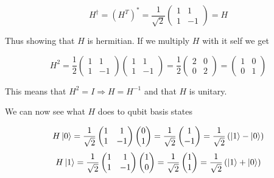\documentclass[a4paper,norsk, 10pt]{article}
\begin{document}
\begin{equation}
H^\dagger = (H^T)^* = 
\frac{1}{\sqrt{2}}
\begin{pmatrix}
1 & 1 \\
1 & -1
\end{pmatrix}
= H
\end{equation}

Thus showing that $H$ is hermitian. If we multiply $H$ with it self we get

\begin{equation}
H^2 = \frac{1}{2}
\begin{pmatrix}
1 & 1 \\
1 & -1
\end{pmatrix}
\begin{pmatrix}
1 & 1 \\
1 & -1
\end{pmatrix}
=\frac{1}{2}
\begin{pmatrix}
2 & 0 \\
0 & 2
\end{pmatrix}
=
\begin{pmatrix}
1 & 0 \\
0 & 1
\end{pmatrix}
\end{equation}

This means that $H^2 = I \Rightarrow H = H^{-1}$ and that $H$ is unitary.

We can now see what $H$ does to qubit basis states

\begin{equation}
H\ket{0} = 
\frac{1}{\sqrt{2}}
\begin{pmatrix}
1 & 1 \\
1 & -1
\end{pmatrix}
\begin{pmatrix}
0 \\1
\end{pmatrix}
= \frac{1}{\sqrt{2}}
\begin{pmatrix}
1 \\ -1
\end{pmatrix}
=\frac{1}{\sqrt{2}}\left(\ket{1} - \ket{0}\right)
\end{equation}
\begin{equation}
H\ket{1} = 
\frac{1}{\sqrt{2}}
\begin{pmatrix}
1 & 1 \\
1 & -1
\end{pmatrix}
\begin{pmatrix}
1 \\ 0
\end{pmatrix}
= \frac{1}{\sqrt{2}}
\begin{pmatrix}
1 \\ 1
\end{pmatrix}
=\frac{1}{\sqrt{2}}\left(\ket{1} + \ket{0}\right)
\end{equation}
\end{document}
